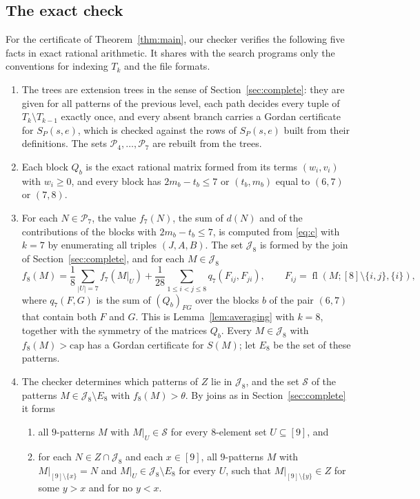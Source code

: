 \documentclass[11pt]{amsart}
\theoremstyle{definition}
\theoremstyle{remark}
\numberwithin{equation}{section}
\newcommand{\cP}{\mathcal{P}}
\newcommand{\cJ}{\mathcal{J}}
\newcommand{\fl}{\operatorname{fl}}
\newcommand{\capv}{\mathrm{cap}}
\newcommand{\cS}{\mathcal{S}}
\begin{document}
\subsection{The exact check}\label{sec:check}
For the certificate of Theorem~\ref{thm:main}, our checker verifies the following five facts in exact rational arithmetic. It shares with the search programs only the conventions for indexing $T_k$ and the file formats.
\begin{enumerate}[label=(\roman*)]
\item\label{st:trees} The trees are extension trees in the sense of Section~\ref{sec:complete}: they are given for all patterns of the previous level, each path decides every tuple of $T_k\setminus T_{k-1}$ exactly once, and every absent branch carries a Gordan certificate for $S_P(s,e)$, which is checked against the rows of $S_P(s,e)$ built from their definitions. The sets $\cP_4,\dots,\cP_7$ are rebuilt from the trees.
\item\label{st:Q} Each block $Q_b$ is the exact rational matrix formed from its terms $(w_i,v_i)$ with $w_i\ge0$, and every block has $2m_b-t_b\le7$ or $(t_b,m_b)$ equal to $(6,7)$ or $(7,8)$.
\item\label{st:f8} For each $N\in\cP_7$, the value $f_7(N)$, the sum of $d(N)$ and of the contributions of the blocks with $2m_b-t_b\le7$, is computed from \eqref{eq:c} with $k=7$ by enumerating all triples $(J,A,B)$. The set $\cJ_8$ is formed by the join of Section~\ref{sec:complete}, and for each $M\in\cJ_8$
\[
f_8(M)=\frac18\sum_{|U|=7}f_7(M|_U)+\frac1{28}\sum_{1\le i<j\le8}q_7(F_{ij},F_{ji}),\qquad F_{ij}=\fl(M;[8]\setminus\{i,j\},\{i\}),
\]
where $q_7(F,G)$ is the sum of $(Q_b)_{FG}$ over the blocks $b$ of the pair $(6,7)$ that contain both $F$ and $G$. This is Lemma~\ref{lem:averaging} with $k=8$, together with the symmetry of the matrices $Q_b$. Every $M\in\cJ_8$ with $f_8(M)>\capv$ has a Gordan certificate for $S(M)$; let $E_8$ be the set of these patterns.
\item\label{st:join9} The checker determines which patterns of $Z$ lie in $\cJ_8$, and the set $\cS$ of the patterns $M\in\cJ_8\setminus E_8$ with $f_8(M)>\theta$. By joins as in Section~\ref{sec:complete} it forms
\begin{enumerate}[label=(\alph*)]
\item\label{st:a} all $9$-patterns $M$ with $M|_U\in\cS$ for every $8$-element set $U\subseteq[9]$, and
\item\label{st:b} for each $N\in Z\cap\cJ_8$ and each $x\in[9]$, all $9$-patterns $M$ with $M|_{[9]\setminus\{x\}}=N$ and $M|_U\in\cJ_8\setminus E_8$ for every $U$, such that $M|_{[9]\setminus\{y\}}\in Z$ for some $y>x$ and for no $y<x$.

\end{enumerate}
\end{enumerate}
\end{document}
